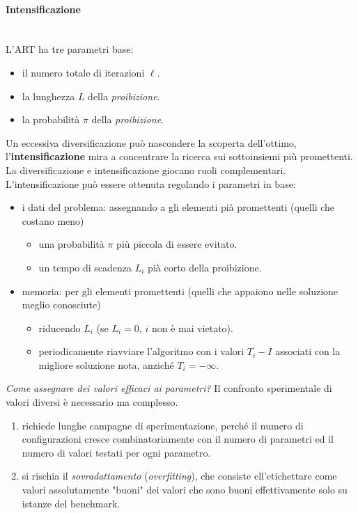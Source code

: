\documentclass{article}
\begin{document}
\paragraph{Intensificazione}\mbox{}\\
L'ART ha tre parametri base:
\begin{itemize}
    \item il numero totale di iterazioni $\ell$.
    \item la lunghezza $L$ della \textit{proibizione}.
    \item la probabilità $\pi$ della \textit{proibizione}.
\end{itemize}
Un eccessiva diversificazione può nascondere la scoperta dell'ottimo, l'\textbf{intensificazione}
mira a concentrare la ricerca sui sottoinsiemi più promettenti. La diversificazione e intensificazione
giocano ruoli complementari.
L'intensificazione può essere ottenuta regolando i parametri in base:
\begin{itemize}
    \item i dati del problema: assegnando a gli elementi pià promettenti (quelli che costano meno)
    \begin{itemize}
        \item una probabilità $\pi$ più piccola di essere evitato.
        \item un tempo di scadenza $L_i$ pià corto della proibizione.
    \end{itemize}
    \item memoria: per gli elementi promettenti (quelli che appaiono nelle soluzione meglio conosciute)
    \begin{itemize}
        \item riducendo $L_i$ (se $L_i=0$, $i$ non è mai vietato).
        \item periodicamente riavviare l'algoritmo con i valori $T_i -I$ associati con la migliore
        soluzione nota, anziché $T_i=-\infty$.
    \end{itemize}
\end{itemize}

\textit{Come assegnare dei valori efficaci ai parametri?} Il confronto sperimentale di valori diversi
è necessario ma complesso.
\begin{enumerate}
    \item richiede lunghe campagne di sperimentazione, perché il numero di configurazioni
    cresce combinatoriamente con il numero di parametri ed il numero di valori testati per ogni
    parametro.
    \item si rischia il \textit{sovradattamento} (\textit{overfitting}), che consiste ell'etichettare
    come valori assolutamente "buoni" dei valori che sono buoni effettivamente solo su istanze del benchmark.
\end{enumerate}
\end{document}
